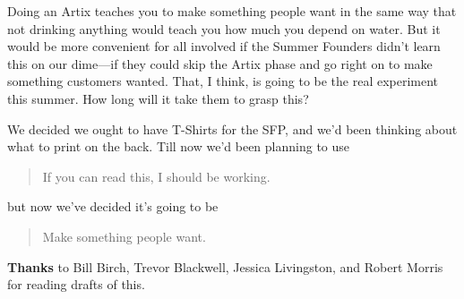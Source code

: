 Doing an Artix teaches you to make something people want in the same way
that not drinking anything would teach you how much you depend on water.
But it would be more convenient for all involved if the Summer Founders
didn't learn this on our dime---if they could skip the Artix phase and
go right on to make something customers wanted. That, I think, is going
to be the real experiment this summer. How long will it take them to
grasp this?

We decided we ought to have T-Shirts for the SFP, and we'd been thinking
about what to print on the back. Till now we'd been planning to use

\begin{quote}
If you can read this, I should be working.
\end{quote}

but now we've decided it's going to be

\begin{quote}
Make something people want.
\end{quote}


\textbf{Thanks} to Bill Birch, Trevor Blackwell, Jessica Livingston, and
Robert Morris for reading drafts of this.